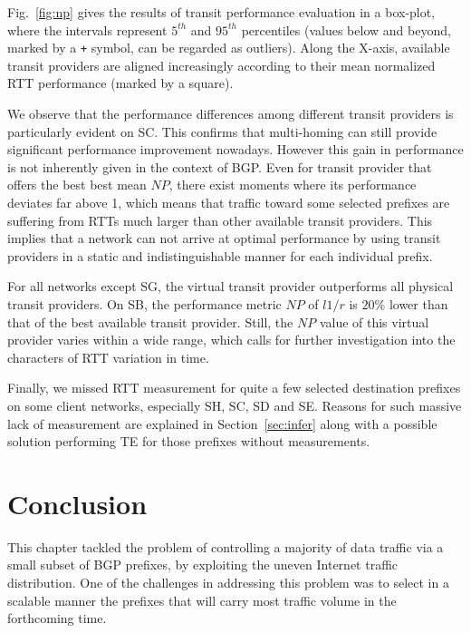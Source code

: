 Fig.~\ref{fig:np} gives the results of transit performance evaluation in a box-plot, where the intervals represent $5^{th}$ and $95^{th}$ percentiles (values below and beyond, marked by a \texttt{+} symbol, can be regarded as outliers).
Along the X-axis, available transit providers are aligned increasingly according to their mean normalized RTT performance (marked by a square). 

We observe that the performance differences among different transit providers is particularly evident on SC.
This confirms that multi-homing can still provide significant performance improvement nowadays. 
However this gain in performance is not inherently given in the context of BGP.
Even for transit provider that offers the best best mean $NP$, there exist moments where its performance deviates far above 1, which means that traffic toward some selected prefixes are suffering from RTTs much larger than other available transit providers.
This implies that a network can not arrive at optimal performance by using transit providers in a static and indistinguishable manner for each individual prefix.

For all networks except SG, the virtual transit provider outperforms all physical transit providers.
On SB, the performance metric $NP$ of $l1/r$ is $20\%$ lower than that of the best available transit provider.
Still, the $NP$ value of this virtual provider varies within a wide range, which calls for further investigation into the characters of RTT variation in time.

Finally, we missed RTT measurement for quite a few selected destination prefixes on some client networks, especially SH, SC, SD and SE. Reasons for such massive lack of measurement are explained in Section~\ref{sec:infer} along with a possible solution performing TE for those prefixes without measurements.

\section*{Conclusion}
\label{sec:fut}
This chapter tackled the problem of controlling a majority of data traffic via 
a small subset of BGP prefixes, by exploiting the uneven Internet traffic distribution. 
One of the challenges in addressing this problem was to select in a scalable manner the prefixes that will carry most traffic volume in the forthcoming time.  

